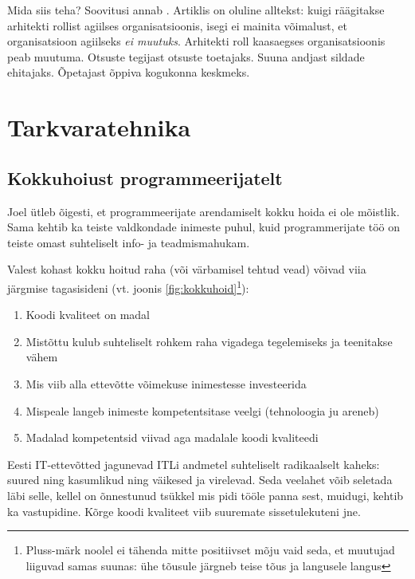 \documentclass{tufte-book}
\begin{document}
Mida siis teha? Soovitusi annab \cite{fowlerlean}. Artiklis on oluline alltekst: kuigi räägitakse arhitekti rollist agiilses organisatsioonis, isegi ei mainita võimalust, et organisatsioon agiilseks \emph{ei muutuks}. Arhitekti roll kaasaegses organisatsioonis peab muutuma. Otsuste tegijast otsuste toetajaks. Suuna andjast sildade ehitajaks. Õpetajast õppiva kogukonna keskmeks. 

\chapter{Tarkvaratehnika}
\section{Kokkuhoiust programmeerijatelt}
\label{sec:kokkuhoid}
Joel ütleb õigesti, et programmeerijate arendamiselt kokku hoida ei ole mõistlik. Sama kehtib ka teiste valdkondade inimeste puhul, kuid programmerijate töö on teiste omast suhteliselt info- ja teadmismahukam.

Valest kohast kokku hoitud raha (või värbamisel tehtud vead) võivad viia järgmise tagasisideni (vt. joonis \ref{fig:kokkuhoid}\footnote{Pluss-märk noolel ei tähenda mitte positiivset mõju vaid seda, et muutujad liiguvad samas suunas: ühe tõusule järgneb teise tõus ja langusele langus}):
\begin{enumerate}
	\item Koodi kvaliteet on madal
	\item Mistõttu kulub suhteliselt rohkem raha vigadega tegelemiseks ja teenitakse vähem
	\item Mis viib alla ettevõtte võimekuse inimestesse investeerida
	\item Mispeale langeb inimeste kompetentsitase veelgi (tehnoloogia ju areneb)
	\item Madalad kompetentsid viivad aga madalale koodi kvaliteedi
\end{enumerate}

Eesti IT-ettevõtted jagunevad ITLi andmetel suhteliselt radikaalselt kaheks: suured ning kasumlikud ning väikesed ja virelevad. Seda veelahet võib seletada läbi selle, kellel on õnnestunud tsükkel mis pidi tööle panna sest, muidugi, kehtib ka vastupidine. Kõrge koodi kvaliteet viib suuremate sissetulekuteni jne.
\end{document}
